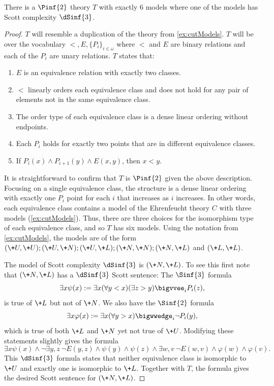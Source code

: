 \documentclass{amsart}
\renewcommand{\-}{\text{-}}
\begin{document}
\begin{proposition}
There is a $\Pinf{2}$ theory $T$ with exactly 6 models where one of the models has Scott complexity $\dSinf{3}$.
\end{proposition}

\begin{proof}
$T$ will resemble a duplication of the theory from \cref{ex:cutModels}.
$T$ will be over the vocabulary $<,E,\{P_i\}_{i\in\omega}$ where $<$ and $E$ are binary relations and each of the $P_i$ are unary relations.
$T$ states that:
\begin{enumerate}
	\item $E$ is an equivalence relation with exactly two classes.
	\item $<$ linearly orders each equivalence class and does not hold for any pair of elements not in the same equivalence class.
	\item The order type of each equivalence class is a dense linear ordering without endpoints.
	\item Each $P_i$ holds for exactly two points that are in different equivalence classes.
	\item If $P_i(x)\land P_{i+1}(y) \land E(x,y)$, then $x<y$.
\end{enumerate}
It is straightforward to confirm that $T$ is $\Pinf{2}$ given the above description.
Focusing on a single equivalence class, the structure is a dense linear ordering with exactly one $P_i$ point for each $i$ that increases as $i$ increases.
In other words, each equivalence class contains a model of the Ehrenfeucht theory $C$ with three models (\cref{ex:cutModels}).
Thus, there are three choices for the isomorphism type of each equivalence class, and so $T$ has six models.
Using the notation from \cref{ex:cutModels}, the models are of the form $(\+U,\+U);(\+U,\+N);(\+U,\+L);(\+N,\+N);(\+N,\+L)$ and $(\+L,\+L)$.

The model of Scott complexity $\dSinf{3}$ is $(\+N,\+L)$.
To see this first note that $(\+N,\+L)$ has a $\dSinf{3}$ Scott sentence:
The $\Sinf{3}$ formula 
\[\exists x\psi(x):=\exists x (\forall y<x) (\exists z>y) \bigvvee_i P_i(z),\]
is true of $\+L$ but not of $\+N$.
We also have the $\Sinf{2}$ formula
\[\exists x\varphi(x):=\exists x(\forall y>x) \bigwwedge_i \lnot P_i(y),\]
which is true of both $\+L$ and $\+N$ yet not true of $\+U$.
Modifying these statements slightly gives the formula
\[\exists x\psi(x) \land \lnot\exists y,z \ \lnot E(y,z) \land \psi(y) \land \psi(z) \land \exists w,v \ \lnot E(w,v) \land \varphi(w) \land \varphi(v).\]
This $\dSinf{3}$ formula states that neither equivalence class is isomorphic to $\+U$ and exactly one is isomorphic to $\+L$.
Together with $T$, the formula gives the desired Scott sentence for $(\+N,\+L)$.


\end{proof}
\end{document}
